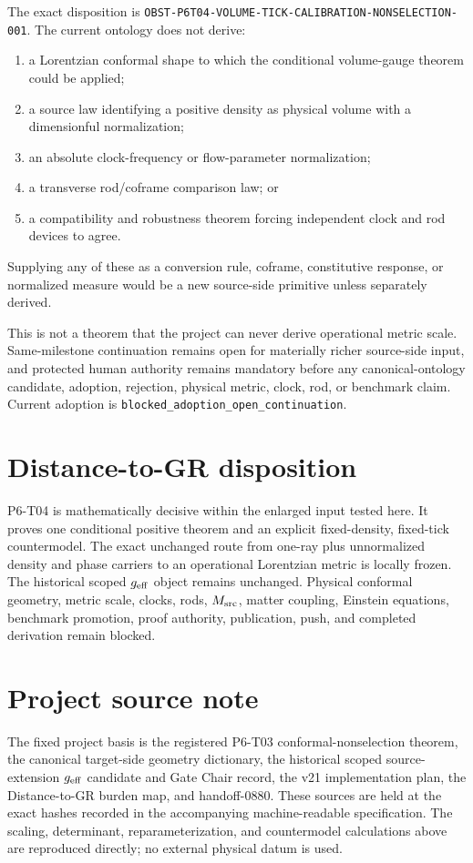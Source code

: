 \documentclass[11pt]{article}
\begin{document}
The exact disposition is
\texttt{OBST-P6T04-VOLUME-TICK-CALIBRATION-NONSELECTION-001}.  The current
ontology does not derive:
\begin{enumerate}
\item a Lorentzian conformal shape to which the conditional volume-gauge
theorem could be applied;
\item a source law identifying a positive density as physical volume with a
dimensionful normalization;
\item an absolute clock-frequency or flow-parameter normalization;
\item a transverse rod/coframe comparison law; or
\item a compatibility and robustness theorem forcing independent clock and
rod devices to agree.
\end{enumerate}
Supplying any of these as a conversion rule, coframe, constitutive response,
or normalized measure would be a new source-side primitive unless separately
derived.

This is not a theorem that the project can never derive operational metric
scale.  Same-milestone continuation remains open for materially richer
source-side input, and protected human authority remains mandatory before
any canonical-ontology candidate, adoption, rejection, physical metric,
clock, rod, or benchmark claim.  Current adoption is
\texttt{blocked\_adoption\_open\_continuation}.

\section{Distance-to-GR disposition}

P6-T04 is mathematically decisive within the enlarged input tested here.  It
proves one conditional positive theorem and an explicit fixed-density,
fixed-tick countermodel.  The exact unchanged route from one-ray plus
unnormalized density and phase carriers to an operational Lorentzian metric
is locally frozen.  The historical scoped \(g_{\rm eff}\) object remains
unchanged.  Physical conformal geometry, metric scale, clocks, rods,
\(M_{\rm src}\), matter coupling, Einstein equations, benchmark promotion,
proof authority, publication, push, and completed derivation remain blocked.

\section{Project source note}

The fixed project basis is the registered P6-T03 conformal-nonselection
theorem, the canonical target-side geometry dictionary, the historical scoped
source-extension \(g_{\rm eff}\) candidate and Gate Chair record, the v21
implementation plan, the Distance-to-GR burden map, and handoff-0880.  These
sources are held at the exact hashes recorded in the accompanying
machine-readable specification.  The scaling, determinant,
reparameterization, and countermodel calculations above are reproduced
directly; no external physical datum is used.
\end{document}
